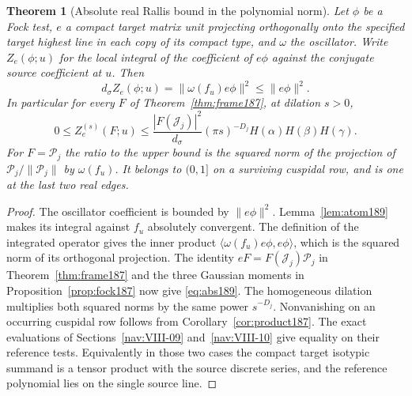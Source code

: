 \documentclass[a4paper,11pt]{article}
\newtheorem{theorem}[proposition]{Theorem}
\theoremstyle{definition}
\theoremstyle{remark}
\numberwithin{equation}{section}
\begin{document}
\begin{theorem}[Absolute real Rallis bound in the polynomial norm]
\label{thm:bound189}
Let \(\phi\) be a Fock test, \(e\) a compact target matrix
unit projecting orthogonally onto the specified target
highest line in each copy of its compact type, and \(\omega\)
the oscillator. Write \(Z_e(\phi;u)\) for the local integral
of the coefficient of \(e\phi\) against the conjugate
source coefficient at \(u\). Then
\[
      d_\sigma Z_e(\phi;u)
          =\|\omega(f_u)e\phi\|^2\le\|e\phi\|^2 .
\]
In particular for every \(F\) of Theorem~\ref{thm:frame187},
at dilation \(s>0\),
\begin{equation}
 0\le Z_e^{(s)}(F;u)\le
   \frac{|F(\mathcal J_j)|^2}{d_\sigma}
       (\pi s)^{-D_j}H(\alpha)H(\beta)H(\gamma).
                                                       \label{eq:abs189}
\end{equation}
For \(F=\mathcal P_j\) the ratio to the upper bound
is the squared norm of the projection of
\(\mathcal P_j/\|\mathcal P_j\|\) by \(\omega(f_u)\).
It belongs to \((0,1]\) on a surviving cuspidal row, and
is one at the last two real edges.
\end{theorem}
\begin{proof}
The oscillator coefficient is bounded by \(\|e\phi\|^2\).
Lemma~\ref{lem:atom189} makes its integral against \(f_u\)
absolutely convergent. The definition of the integrated
operator gives the inner product
\(\langle\omega(f_u)e\phi,e\phi\rangle\), which is the
squared norm of its orthogonal projection. The identity
\(eF=F(\mathcal J_j)\mathcal P_j\) in
Theorem~\ref{thm:frame187} and the three Gaussian moments
in Proposition~\ref{prop:fock187} now give \eqref{eq:abs189}.
The homogeneous dilation multiplies both squared norms by
the same power \(s^{-D_j}\).
Nonvanishing on an occurring cuspidal row follows from
Corollary~\ref{cor:product187}. The exact evaluations of
Sections~\ref{nav:VIII-09} and~\ref{nav:VIII-10} give equality on their reference tests.
Equivalently in those two cases the compact target isotypic
summand is a tensor product with the source discrete series,
and the reference polynomial lies on the single source line.
\end{proof}
\end{document}
